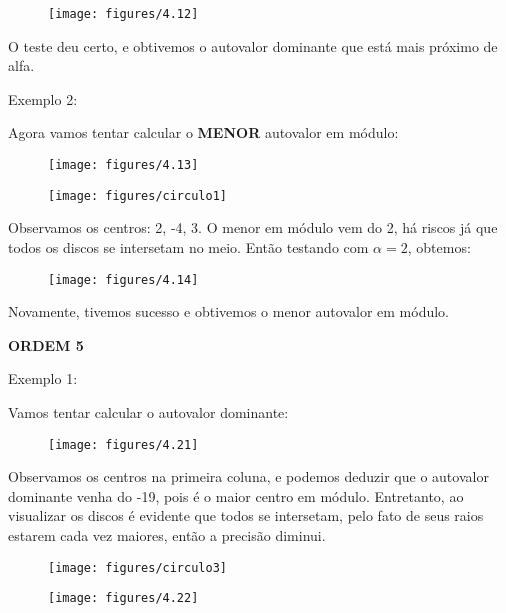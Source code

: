 \documentclass[leqno]{article}
\numberwithin{equation}{section}
\begin{document}
\begin{enumerate}
		\begin{figure}[H]
			\centering
			\texttt{[image: figures/4.12]}
		\end{figure}
	
		O teste deu certo, e obtivemos o autovalor dominante que está mais próximo de alfa.
	
		Exemplo 2:
		
		Agora vamos tentar calcular o \textbf{MENOR} autovalor em módulo:
		
		\begin{figure}[H]
			\centering
			\texttt{[image: figures/4.13]}
		\end{figure}
	
		\begin{figure}[H]
			\centering
			\texttt{[image: figures/circulo1]}
		\end{figure}
		
		Observamos os centros: 2, -4, 3. O menor em módulo vem do 2, há riscos já que todos os discos se intersetam no meio. Então testando com $\alpha = 2$, obtemos:
		
		\begin{figure}[H]
			\centering
			\texttt{[image: figures/4.14]}
		\end{figure}
	
		Novamente, tivemos sucesso e obtivemos o menor autovalor em módulo.
		
		\textbf{{\large ORDEM 5}}
		
		Exemplo 1:
		
		Vamos tentar calcular o autovalor dominante:
		
		\begin{figure}[H]
			\centering
			\texttt{[image: figures/4.21]}
		\end{figure}
	
		Observamos os centros na primeira coluna, e podemos deduzir que o autovalor dominante venha do -19, pois é o maior centro em módulo.
		Entretanto, ao visualizar os discos é evidente que todos se intersetam, pelo fato de seus raios estarem cada vez maiores, então a precisão diminui.
	
		\begin{figure}[H]
			\centering
			\texttt{[image: figures/circulo3]}
		\end{figure}
	
	
		\begin{figure}[H]
			\centering
			\texttt{[image: figures/4.22]}
		\end{figure}
	

\end{enumerate}
\end{document}
